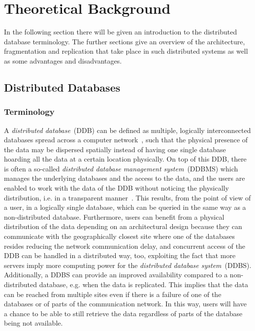 
\section{Theoretical Background}
\label{sec:theo}

In the following section there will be given an introduction to the distributed database terminology. The further sections give an overview of the 
architecture, fragmentation and replication that take place in such distributed systems as well as some advantages and disadvantages.

\subsection{Distributed Databases}
\label{sec:theo_ddb}

\subsubsection{Terminology}
\label{sec:theo_ddb_term}
A \emph{distributed database}~(DDB) can be defined as multiple, logically interconnected databases spread across a computer network~\cite[p.~4]{Ozsu1991}, such
that the physical presence of the data may be dispersed spatially instead of having one single database hoarding all the data at a certain location physically.
On top of this DDB, there is often a so-called \emph{distributed database management system}~(DDBMS) which manages the underlying databases and the access to 
the data, and the users are enabled to work with the data of the DDB without noticing the physically distribution, i.e. in a transparent 
manner~\cite[p.~4f.]{Ozsu1991}.
This results, from the point of view of a user, in a logically single database, which can be queried in the same way as a non-distributed database. 
Furthermore, users can benefit from a physical distribution of the data depending on an architectural design because they can communicate with the 
geographically closest site where one of the databases resides reducing the network communication delay, and concurrent access of the DDB can be handled in a 
distributed way, too, exploiting the fact that more servers imply more computing power for the \emph{distributed database system}~(DDBS). Additionally, a DDBS 
can provide an improved availability compared to a non-distributed database, e.g. when the data is replicated. This implies that the data can be reached from 
multiple sites even if there is a failure of one of the databases or of parts of the communication network. In this way, users will have a chance to be able
to still retrieve the data regardless of parts of the database being not available.


